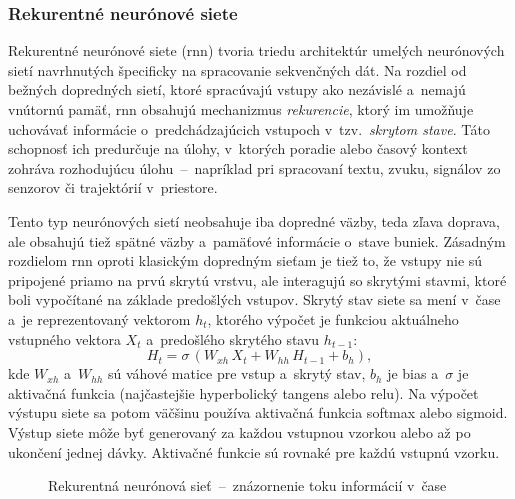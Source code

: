   \subsubsection{Rekurentné neurónové siete}\label{ssec:rnn}
  
    Rekurentné neurónové siete (\acrshort{rnn}) tvoria triedu architektúr umelých neurónových sietí navrhnutých špecificky na spracovanie sekvenčných dát. Na rozdiel od bežných dopredných sietí, ktoré spracúvajú vstupy ako nezávislé a~nemajú vnútornú pamäť, \acrshort{rnn} obsahujú mechanizmus \emph{rekurencie}, ktorý im umožňuje uchovávať informácie o~predchádzajúcich vstupoch v~tzv.\ \emph{skrytom stave}. Táto schopnosť ich predurčuje na úlohy, v~ktorých poradie alebo časový kontext zohráva rozhodujúcu úlohu~--~napríklad pri spracovaní textu, zvuku, signálov zo senzorov či trajektórií v~priestore.

    Tento typ neurónových sietí neobsahuje iba dopredné väzby, teda zľava doprava, ale obsahujú tiež spätné väzby a~pamäťové informácie o~stave buniek. Zásadným rozdielom \acrshort{rnn} oproti klasickým dopredným sieťam je tiež to, že vstupy nie sú pripojené priamo na prvú skrytú vrstvu, ale interagujú so skrytými stavmi, ktoré boli vypočítané na základe predošlých vstupov. Skrytý stav siete sa mení v~čase a~je reprezentovaný vektorom $h_t$, ktorého výpočet je funkciou aktuálneho vstupného vektora $X_t$ a~predošlého skrytého stavu $h_{t-1}$:
    \begin{equation}
      H_t = \sigma\, (W_{xh}\, X_t + W_{hh}\, H_{t-1} + b_h),
    \end{equation}
    kde $W_{xh}$ a~$W_{hh}$ sú váhové matice pre vstup a~skrytý stav, $b_h$ je bias a~$\sigma$ je aktivačná funkcia (najčastejšie hyperbolický tangens alebo \acrshort{relu}). Na výpočet výstupu siete sa potom väčšinu používa aktivačná funkcia softmax alebo sigmoid. Výstup siete môže byť generovaný za každou vstupnou vzorkou alebo až po ukončení jednej dávky. Aktivačné funkcie sú rovnaké pre každú vstupnú vzorku.

    \begin{figure}[b!]
      \centering
      
      \caption[Rekurentná neurónová sieť~--~znázornenie toku informácií v~čase]{Rekurentná neurónová sieť~--~znázornenie toku informácií v~čase}
    \end{figure}

